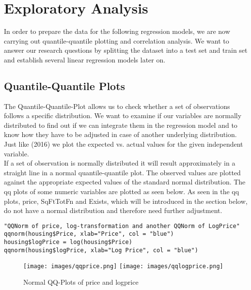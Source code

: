 
\section{Exploratory Analysis}\label{Sec:exploratory}

In order to prepare the data for the following regression models, we are now carrying out quantile-quantile plotting and correlation analysis. We want to answer our research questions by splitting the dataset into a test set and train set and establish several linear regression models later on. 


\subsection{Quantile-Quantile Plots}

The Quantile-Quantile-Plot allows us to check whether a set of observations follows a specific distribution. We want to examine if our variables are normally distributed to find out if we can integrate them in the regression model and to know how they have to be adjusted in case of another underlying distribution. Just like \citeauthor{merellking}(2016) we plot the expected vs. actual values for the given independent variable. \\ %
If a set of observation is normally distributed it will result approximately in a straight line in a normal quantile-quantile plot. The observed values are plotted against the appropriate expected values of the standard normal distribution. The qq plots of some numeric variables are plotted as seen below. As seen in the qq plots, price, SqFtTotFn and Exists, which will be introduced in the section below, do not have a normal distribution and therefore need further adjustment. \\

 \begin{lstlisting}[frame = single,backgroundcolor=\color{hellgelb}]
"QQNorm of price, log-transformation and another QQNorm of LogPrice"
qqnorm(housing$Price, xlab="Price", col = "blue")
housing$logPrice = log(housing$Price)
qqnorm(housing$logPrice, xlab="Log Price", col = "blue")
\end{lstlisting}


\begin{figure}[ht]
\centering
	\texttt{[image: images/qqprice.png]}
	\texttt{[image: images/qqlogprice.png]}
	\caption{Normal QQ-Plots of price and logprice}
\label{}
\end{figure}


